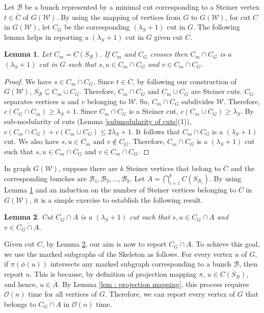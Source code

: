 \documentclass[letterpaper,11pt]{article}
\newtheorem{lemma}{Lemma}[]
\begin{document}
Let ${\mathcal B}$ be a bunch represented by a minimal cut corresponding to a Steiner vertex $t\in \overline{C}$ of $G({\mathcal W})$. By using the mapping of vertices from $G$ to $G({\mathcal W})$, for cut $C$ in $G({\mathcal W})$, let $C_G$ be the corresponding $(\lambda_S+1)$ cut in $G$. The following lemma helps in reporting a $(\lambda_S+1)$ cut in $G$ given cut $C$.
\begin{lemma} \label{lem : intersection is also a desired cut}
    Let $C_m=C(S_{\mathcal B})$. If $C_m$ and $C_G$ crosses then $C_m\cap C_G$ is a $(\lambda_S+1)$ cut in $G$ such that $s,u\in C_m\cap C_G$ and $v\in \overline{C_m\cap C_G}$.
\end{lemma}
\begin{proof}
   We have $s\in C_m\cap C_G$. Since $t\in \overline{C}$, by following our construction of $G({\mathcal W})$, $\overline{S_{\mathcal B}}\subseteq \overline{C_m\cup C_G}$. Therefore, $C_m\cap C_G$ and $C_m\cup C_G$ are Steiner cuts. $C_G$ separates vertices $u$ and $v$ belonging to ${\mathcal W}$. So, $C_m\cap C_G$ subdivides ${\mathcal W}$. Therefore, $c(C_G\cap C_m)\ge \lambda_S+1$. Since $C_m\cap C_G$ is a Steiner cut, $c(C_m\cup C_G)\ge \lambda_S$. By sub-modularity of cuts (Lemma \ref{submodularity of cuts}(1)), $c(C_m\cap C_G)+c(C_m\cup C_G)\le 2\lambda_S+1$. It follows that $C_m\cap C_G$ is a $(\lambda_S+1)$ cut. We also have $s,u\in C_m$ and $v\notin C_G$. Therefore, $C_m\cap C_G$ is a $(\lambda_S+1)$ cut such that $s,u\in C_m\cap C_G$ and $v\in \overline{C_m\cap C_G}$.   
\end{proof}
In graph $G({\mathcal W})$, suppose there are $k$ Steiner vertices that belong to $\overline{C}$ and the corresponding bunches are ${\mathcal B}_1,{\mathcal B}_2,\ldots, {\mathcal B}_k$. Let $A=\bigcap_{i=1}^k C(S_{{\mathcal B}_i})$. By using Lemma \ref{lem : intersection is also a desired cut} and an induction on the number of Steiner vertices belonging to $\overline{C}$ in $G({\mathcal W})$, it is a simple exercise to establish the following result.
\begin{lemma} \label{lem : reporting desired cut}
    Cut $C_G\cap A$ is a $(\lambda_S+1)$ cut such that $s,u\in C_G\cap A$ and $v\in \overline{C_G\cap A}$.
\end{lemma}
Given cut $C$, by Lemma \ref{lem : reporting desired cut}, our aim is now to report $\overline{C_G\cap A}$. To achieve this goal, we use the marked subgraphs of the Skeleton as follows. For every vertex $u$ of $G$, if $\pi(\phi(u))$ intersects any marked subgraph corresponding to a bunch ${\mathcal B}$, then report $u$. This is because, by definition of projection mapping $\pi$, $u\in \overline{C(S_{\mathcal B})}$, and hence, $u\in \overline{A}$. By Lemma \ref{lem : projection mapping}, this process requires ${\mathcal O}(n)$ time for all vertices of $G$. Therefore, we can report every vertex of $G$ that belongs to $\overline{C_G\cap A}$ in ${\mathcal O}(n)$ time. \\
\end{document}
